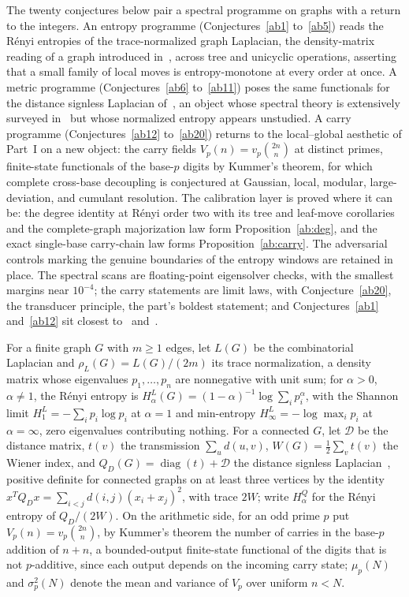 \documentclass[11pt]{article}
\theoremstyle{definition}
\begin{document}
The twenty conjectures below pair a spectral programme on graphs with a return to the integers.  An entropy programme (Conjectures~\ref{ab1} to~\ref{ab5}) reads the R\'enyi entropies of the trace-normalized graph Laplacian, the density-matrix reading of a graph introduced in~\cite{BGS06}, across tree and unicyclic operations, asserting that a small family of local moves is entropy-monotone at every order at once.  A metric programme (Conjectures~\ref{ab6} to~\ref{ab11}) poses the same functionals for the distance signless Laplacian of~\cite{AH13}, an object whose spectral theory is extensively surveyed in~\cite{RGW26} but whose normalized entropy appears unstudied.  A carry programme (Conjectures~\ref{ab12} to~\ref{ab20}) returns to the local--global aesthetic of Part~I on a new object: the carry fields $V_p(n)=v_p\binom{2n}{n}$ at distinct primes, finite-state functionals of the base-$p$ digits by Kummer's theorem, for which complete cross-base decoupling is conjectured at Gaussian, local, modular, large-deviation, and cumulant resolution.  The calibration layer is proved where it can be: the degree identity at R\'enyi order two with its tree and leaf-move corollaries and the complete-graph majorization law form Proposition~\ref{ab:deg}, and the exact single-base carry-chain law forms Proposition~\ref{ab:carry}.  The adversarial controls marking the genuine boundaries of the entropy windows are retained in place.  The spectral scans are floating-point eigensolver checks, with the smallest margins near $10^{-4}$; the carry statements are limit laws, with Conjecture~\ref{ab20}, the transducer principle, the part's boldest statement; and Conjectures~\ref{ab1} and~\ref{ab12} sit closest to~\cite{DHL17} and~\cite{Drm01}.

For a finite graph $G$ with $m\ge1$ edges, let $L(G)$ be the combinatorial Laplacian and $\rho_L(G)=L(G)/(2m)$ its trace normalization, a density matrix whose eigenvalues $p_1,\ldots,p_n$ are nonnegative with unit sum; for $\alpha>0$, $\alpha\ne1$, the R\'enyi entropy is $H^L_\alpha(G)=(1-\alpha)^{-1}\log\sum_ip_i^\alpha$, with the Shannon limit $H^L_1=-\sum_ip_i\log p_i$ at $\alpha=1$ and min-entropy $H^L_\infty=-\log\max_ip_i$ at $\alpha=\infty$, zero eigenvalues contributing nothing.  For a connected $G$, let $\mathcal D$ be the distance matrix, $t(v)$ the transmission $\sum_ud(u,v)$, $W(G)=\tfrac12\sum_vt(v)$ the Wiener index, and $Q_D(G)=\operatorname{diag}(t)+\mathcal D$ the distance signless Laplacian~\cite{AH13}, positive definite for connected graphs on at least three vertices by the identity $x^{T}Q_Dx=\sum_{i<j}d(i,j)(x_i+x_j)^2$, with trace $2W$; write $H^Q_\alpha$ for the R\'enyi entropy of $Q_D/(2W)$.  On the arithmetic side, for an odd prime $p$ put $V_p(n)=v_p\binom{2n}{n}$, by Kummer's theorem the number of carries in the base-$p$ addition of $n+n$, a bounded-output finite-state functional of the digits that is not $p$-additive, since each output depends on the incoming carry state; $\mu_p(N)$ and $\sigma^2_p(N)$ denote the mean and variance of $V_p$ over uniform $n<N$.
\end{document}
